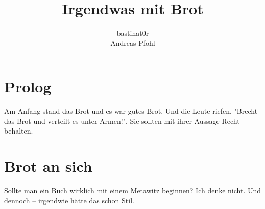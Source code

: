 \documentclass{book}
\title{Irgendwas mit Brot}
\author{bastinat0r\\Andreas Pfohl}
\begin{document}
\maketitle

\chapter*{Prolog}
Am Anfang stand das Brot und es war gutes Brot. Und die Leute riefen,
"Brecht das Brot und verteilt es unter Armen!". Sie sollten mit ihrer Aussage
Recht behalten.

\chapter{Brot an sich}
Sollte man ein Buch wirklich mit einem Metawitz beginnen? Ich denke nicht. Und
dennoch – irgendwie hätte das schon Stil.
\end{document}
